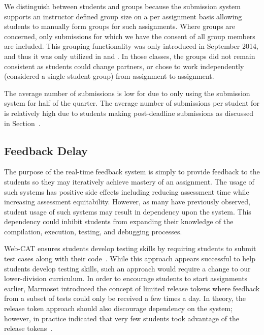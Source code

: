 We distinguish between students and groups because the submission system
supports an instructor defined group size on a per assignment basis allowing
students to manually form groups for such assignments. Where groups are
concerned, only submissions for which we have the consent of all group members
are included. This grouping functionality was only introduced in September
2014, and thus it was only utilized in  and . In those
classes, the groups did not remain consistent as students could change
partners, or chose to work independently (considered a single student group)
from assignment to assignment.

The average number of submissions is low for  due to only using the
submission system for half of the quarter. The average number of submissions
per student for  is relatively high due to students making
post-deadline submissions as discussed in Section~.


\subsection{Feedback Delay} 
The purpose of the real-time feedback system is simply to provide feedback to
the students so they may iteratively achieve mastery of an assignment. The
usage of such systems has positive side effects including reducing assessment
time while increasing assessment equitability. However, as many have previously
observed, student usage of such systems may result in dependency upon the
system. This dependency could inhibit students from expanding their knowledge
of the compilation, execution, testing, and debugging processes.

Web-CAT ensures students develop testing skills by requiring students to submit
test cases along with their code~\cite{Edwards:2003:RCS:949344.949390}. While
this approach appears successful to help students develop testing skills, such
an approach would require a change to our lower-division curriculum. In order
to encourage students to start assignments earlier, Marmoset introduced the
concept of limited release tokens where feedback from a subset of tests could
only be received a few times a day. In theory, the release token approach
should also discourage dependency on the system; however, in practice \spacco{}
indicated that very few students took advantage of the release
tokens~\cite{Spacco:2013:TIP:2462476.2465594}.

